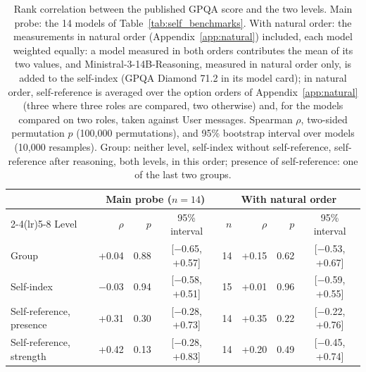 \begin{table}[htbp]
\vspace{1.2em}
\caption{Rank correlation between the published GPQA score and the two levels. Main probe: the 14 models of Table~\ref{tab:self_benchmarks}. With natural order: the measurements in natural order (Appendix~\ref{app:natural}) included, each model weighted equally: a model measured in both orders contributes the mean of its two values, and Ministral-3-14B-Reasoning, measured in natural order only, is added to the self-index (GPQA Diamond 71.2 in its model card); in natural order, self-reference is averaged over the option orders of Appendix~\ref{app:natural} (three where three roles are compared, two otherwise) and, for the models compared on two roles, taken against User messages. Spearman $\rho$, two-sided permutation $p$ (100,000 permutations), and 95\% bootstrap interval over models (10,000 resamples). Group: neither level, self-index without self-reference, self-reference after reasoning, both levels, in this order; presence of self-reference: one of the last two groups.}
\label{tab:self_benchmark_corr}
{\footnotesize
\setlength{\tabcolsep}{4pt}
\begin{tabular}{lrrcrrrc}
\toprule
& \multicolumn{3}{c}{Main probe ($n = 14$)} & \multicolumn{4}{c}{With natural order} \\
\cmidrule(lr){2-4}\cmidrule(lr){5-8}
Level & $\rho$ & $p$ & 95\% interval & $n$ & $\rho$ & $p$ & 95\% interval \\
\midrule
Group & +0.04 & 0.88 & [$-$0.65, +0.57] & 14 & +0.15 & 0.62 & [$-$0.53, +0.67] \\
Self-index & $-$0.03 & 0.94 & [$-$0.58, +0.51] & 15 & +0.01 & 0.96 & [$-$0.59, +0.55] \\
Self-reference, presence & +0.31 & 0.30 & [$-$0.28, +0.73] & 14 & +0.35 & 0.22 & [$-$0.22, +0.76] \\
Self-reference, strength & +0.42 & 0.13 & [$-$0.28, +0.83] & 14 & +0.20 & 0.49 & [$-$0.45, +0.74] \\
\bottomrule
\end{tabular}}
\end{table}
